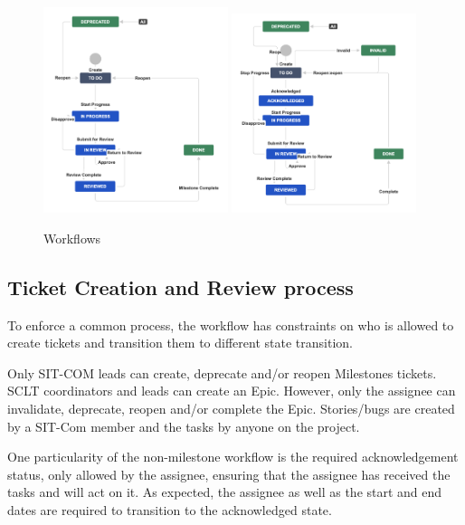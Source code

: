 \documentclass[SE,authoryear,toc]{lsstdoc}
\begin{document}
\begin{figure}[h]
\begin{center}
\includegraphics[width=0.48\textwidth]{WorkFlowMilestones.png}
\includegraphics[width=0.48\textwidth]{WorkFlowNonMilestones.png}
\caption{\label{fig:workflow} Workflows}
\end{center}
\end{figure}


\subsection{Ticket Creation and Review process}
To enforce a common process, the workflow has constraints on who is allowed to create tickets and transition them to different state transition. 

Only SIT-COM leads can create, deprecate and/or reopen Milestones tickets. SCLT coordinators and leads can create an Epic. 
However, only the assignee can invalidate, deprecate, reopen and/or complete the Epic. 
Stories/bugs are created by a SIT-Com member and the tasks by anyone on the project. 

One particularity of the non-milestone workflow is the required acknowledgement status, only allowed by the assignee, ensuring that the assignee has received the tasks and will act on it. 
As expected, the assignee as well as the start and end dates are required to transition to the acknowledged state.
\end{document}
